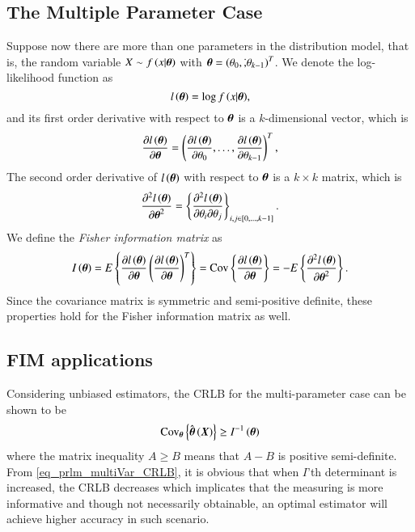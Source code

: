 \subsection{The Multiple Parameter Case}
Suppose now there are more than one parameters in the distribution model, that is, the random variable $X\sim{}f\left({x|\boldsymbol{\theta}}\right)$ with $\boldsymbol{\theta}=\left({\theta_{0},\dot,\theta_{k-1}}\right)^{T}$.
We denote the log-likelihood function as
\begin{equation*}
    l\left({\boldsymbol{\theta}}\right)=\log{f\left({x|\boldsymbol{\theta}}\right)},
\end{equation*}
and its first order derivative with respect to $\boldsymbol{\theta}$ is a $k$-dimensional vector, which is
\begin{equation*}
    \frac{\partial{}l\left({\boldsymbol{\theta}}\right)}{\partial{}\boldsymbol{\theta}}=\left({\frac{\partial{}l\left({\boldsymbol{\theta}}\right)}{\partial{}\theta_{0}},\dots,\frac{\partial{}l\left({\boldsymbol{\theta}}\right)}{\partial{}\theta_{k-1}}}\right)^{T},
\end{equation*}
The second order derivative of $l\left({\boldsymbol{\theta}}\right)$ with respect to $\boldsymbol{\theta}$ is a $k\times{}k$ matrix, which is
\begin{equation*}
    \frac{\partial^{2}l\left({\boldsymbol{\theta}}\right)}{\partial{}\boldsymbol{\theta}^{2}}=\left\{{\frac{\partial^{2}l\left({\boldsymbol{\theta}}\right)}{\partial{}\theta_{i}\partial{}\theta_{j}}}\right\}_{i,j\in\left[{0,\dots,k-1}\right]}.
\end{equation*}
We define the \emph{Fisher information matrix} as
\begin{equation*}
    I\left({\boldsymbol{\theta}}\right)=E\left\{{\frac{\partial{}l\left({\boldsymbol{\theta}}\right)}{\partial\boldsymbol{\theta}}\left({\frac{\partial{}l\left({\boldsymbol{\theta}}\right)}{\partial\boldsymbol{\theta}}}\right)^{T}}\right\}=\text{Cov}\left\{{\frac{\partial{}l\left({\boldsymbol{\theta}}\right)}{\partial\boldsymbol{\theta}}}\right\}=-E\left\{{\frac{\partial^{2}l\left({\boldsymbol{\theta}}\right)}{\partial{}\boldsymbol{\theta}^{2}}}\right\}.
\end{equation*}
Since the covariance matrix is symmetric and semi-positive definite, these properties hold for the Fisher information matrix as well.
\subsection{FIM applications}
Considering unbiased estimators, the CRLB for the multi-parameter case can be shown to be
\begin{equation}
\label{eq_prlm_multiVar_CRLB}
    \text{Cov}_{\boldsymbol{\theta}}\left\{{\hat{\boldsymbol{\theta}}\left({\boldsymbol{X}}\right)}\right\}\geq{}I^{-1}\left({\boldsymbol{\theta}}\right)
\end{equation}
where the matrix inequality $A\geq{}B$ means that $A-B$ is positive semi-definite.
From \eqref{eq_prlm_multiVar_CRLB}, it is obvious that when $I$'th determinant is increased, the CRLB decreases which implicates that the measuring is more informative and though not necessarily obtainable, an optimal estimator will achieve higher accuracy in such scenario.
